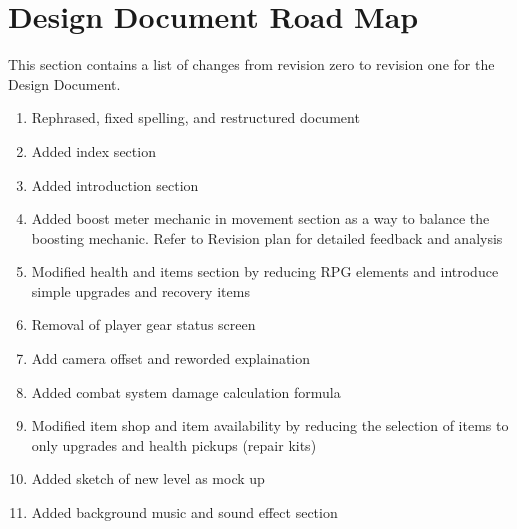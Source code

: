 \documentclass[]{article}
\begin{document}
\section*{Design Document Road Map}
This section contains a list of changes from revision zero to revision one for the Design Document.
\begin{enumerate}
	\item Rephrased, fixed spelling, and restructured document
	\item Added index section
	\item Added introduction section
	\item Added boost meter mechanic in movement section as a way to balance the boosting mechanic. Refer to Revision plan for detailed feedback and analysis
	\item Modified health and items section by reducing RPG elements and introduce simple upgrades and recovery items
	\item Removal of player gear status screen
	\item Add camera offset and reworded explaination
	\item Added combat system damage calculation formula
	\item Modified item shop and item availability by reducing the selection of items to only upgrades and health pickups (repair kits)
	\item Added sketch of new level as mock up
	\item Added background music and sound effect section 
\end{enumerate}
\end{document}

